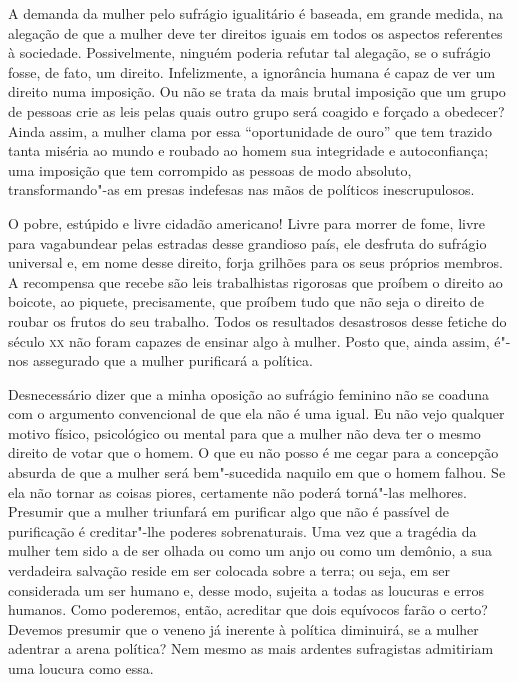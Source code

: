 A demanda da mulher pelo sufrágio igualitário é baseada, em grande
medida, na alegação de que a mulher deve ter direitos iguais em todos os aspectos referentes à sociedade. Possivelmente, ninguém poderia refutar
tal alegação, se o sufrágio fosse, de fato, um direito. Infelizmente, a
ignorância humana é capaz de ver um direito numa imposição. Ou não se
trata da mais brutal imposição que um grupo de pessoas crie as leis
pelas quais outro grupo será coagido e forçado a obedecer? Ainda assim,
a mulher clama por essa ``oportunidade de ouro'' que tem trazido tanta
miséria ao mundo e roubado ao homem sua integridade e autoconfiança; uma
imposição que tem corrompido as pessoas de modo absoluto,
transformando"-as em presas indefesas nas mãos de políticos
inescrupulosos.

O pobre, estúpido e livre cidadão americano! Livre para morrer de fome,
livre para vagabundear pelas estradas desse grandioso país, ele desfruta
do sufrágio universal e, em nome desse direito, forja grilhões para os seus
próprios membros. A recompensa que recebe são leis trabalhistas
rigorosas que proíbem o direito ao boicote, ao piquete, precisamente,
que proíbem tudo que não seja o direito de roubar os frutos do seu
trabalho. Todos os resultados desastrosos desse fetiche do século \textsc{xx} não
foram capazes de ensinar algo à mulher. Posto que, ainda assim, é"-nos assegurado que a mulher purificará a política.

Desnecessário dizer que a minha oposição ao sufrágio feminino não se
coaduna com o argumento convencional de que ela não é uma igual. Eu não
vejo qualquer motivo físico, psicológico ou mental para que a mulher não
deva ter o mesmo direito de votar que o homem. O que eu não posso é me
cegar para a concepção absurda de que a mulher será bem"-sucedida naquilo
em que o homem falhou. Se ela não tornar as coisas piores, certamente
não poderá torná"-las melhores. Presumir que a mulher triunfará em
purificar algo que não é passível de purificação é creditar"-lhe poderes\label{purificar}
sobrenaturais. Uma vez que a tragédia da mulher tem sido a de ser olhada
ou como um anjo ou como um demônio, a sua verdadeira salvação reside em ser
colocada sobre a terra; ou seja, em ser considerada um ser humano e,
desse modo, sujeita a todas as loucuras e erros humanos. Como poderemos,
então, acreditar que dois equívocos farão o certo? Devemos presumir que
o veneno já inerente à política diminuirá, se a mulher adentrar a arena
política? Nem mesmo as mais ardentes sufragistas admitiriam uma loucura
como essa.

